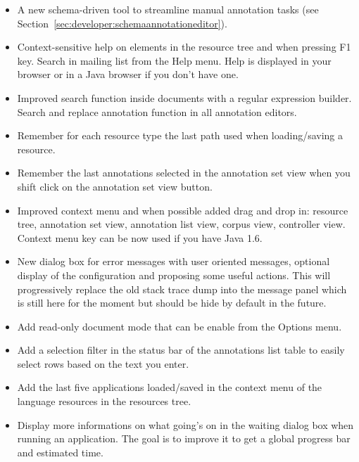 \begin{itemize}
\item A new schema-driven tool to streamline manual annotation tasks
(see Section~\ref{sec:developer:schemaannotationeditor}).

\item Context-sensitive help on elements in the resource tree and when
pressing F1 key. Search in mailing list from the Help menu. Help is displayed
in your browser or in a Java browser if you don't have one.

\item Improved search function inside documents with a regular expression
builder. Search and replace annotation function in all annotation editors.

\item Remember for each resource type the last path used when loading/saving
a resource.

\item Remember the last annotations selected in the annotation set
view when you shift click on the annotation set view button.

\item Improved context menu and when possible added drag and drop in:
resource tree, annotation set view, annotation list view, corpus view,
controller view. Context menu key can be now used if you have Java 1.6.

\item New dialog box for error messages with user oriented messages,
optional display of the configuration and proposing some useful
actions. This will progressively replace the old stack trace dump into the
message panel which is still here for the moment but should be hide by
default in the future.

\item Add read-only document mode that can be enable from the Options menu.

\item Add a selection filter in the status bar of the annotations list table
to easily select rows based on the text you enter.

\item Add the last five applications loaded/saved in the context menu of the
language resources in the resources tree.

\item Display more informations on what going's on in the waiting dialog box
when running an application. The goal is to improve it to get a global
progress bar and estimated time.
\end{itemize}

